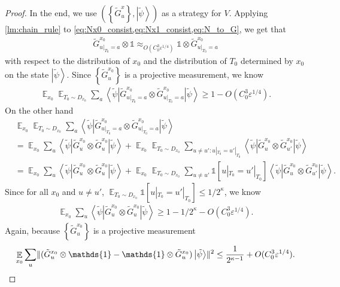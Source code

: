 \documentclass[11pt]{article}
\theoremstyle{plain}
\theoremstyle{definition}
\newcommand {\set} [1] {\ensuremath{ \left\lbrace #1 \right\rbrace }}
\DeclarePairedDelimiter{\norm}{\lVert}{\rVert}
\newcommand {\bra} [1] {\ensuremath{ \left\langle #1 \right| }}
\newcommand {\ket} [1] {\ensuremath{ \left| #1 \right\rangle }}
\DeclareMathOperator*{\bigE}{\mathbb{E}}
\newcommand {\id} {\ensuremath{\mathds{1}}}
\newcommand{\ep} {\ensuremath{\varepsilon}}
\newcommand{\x}{\otimes}
\newcommand{\appd}[1]{\approx_{#1}}
\newcommand{\1}{\mathbb{1}} %
\newcommand{\tG}{\tilde{G}}
\newcommand{\tpsi}{\tilde{\psi}}
\begin{document}
\begin{proof}
In the end, we use $(\set{ \tG^x_u }, \ket{\tpsi})$ as a strategy for $V$.
Applying \cref{lm:chain_rule} to \cref{eq:Nx0_consist,eq:Nx1_consist,eq:N_to_G}, we get that 
\begin{align*}
	\tG^{x_0}_{u|_{T_0}=a} \x \id \appd{O(C_0^3\ep^{1/4})} \id \x \tG^{x_0}_{u|_{T_0}= a}
\end{align*}
with respect to the distribution of $x_0$ and the distribution of $T_0$ determined by $x_0$ on the state $\ket{\tpsi}$.
Since $\set{ \tG^{x_0}_u }$ is a projective measurement, we know
\begin{align*}
	\bigE_{x_0} \bigE_{T_0 \sim D_{x_0}} \sum_a \bra{\tpsi} \tG^{x_0}_{u|_{T_0} = a} \x \tG^{x_0}_{u|_{T_0} = a} \ket{\tpsi} \geq 1 - O(C_0^3\ep^{1/4}).
\end{align*}
On the other hand
\begin{align*}
	&\bigE_{x_0} \bigE_{T_0 \sim D_{x_0}} \sum_a \bra{\tpsi} \tG^{x_0}_{u|_{T_0} = a} \x \tG^{x_0}_{u|_{T_0} = a} \ket{\tpsi} \\
	&= \bigE_{x_0} \sum_u \bra{\tpsi} \tG^{x_0}_{u} \x \tG^{x_0}_{u} \ket{\tpsi} 
	+ \bigE_{x_0} \bigE_{T_0\sim D_{x_0}} \sum_{u\neq u': u|_{T_0} = u'|_{T_0}} \bra{\tpsi} \tG^{x_0}_{u} \x \tG^{x_0}_{u'} \ket{\tpsi} \\
	&= \bigE_{x_0} \sum_u \bra{\tpsi} \tG^{x_0}_{u} \x \tG^{x_0}_{u} \ket{\tpsi} + 
	\bigE_{x_0} \bigE_{T_0\sim D_{x_0}} \sum_{u \neq u'} \id[u|_{T_0} = u'|_{T_0}] \bra{\tpsi} \tG^{x_0}_{u} \x \tG^{x_0}_{u'} \ket{\tpsi}.
\end{align*}
Since for all $x_0$ and $u \neq u'$, $\bigE_{T_0\sim D_{x_0}}\id[u|_{T_0} = u'|_{T_0}] \leq 1/2^\kappa$, we know
\begin{align*}
	 \bigE_{x_0} \sum_u \bra{\tpsi} \tG^{x_0}_{u} \x \tG^{x_0}_{u} \ket{\tpsi} \geq 1 - 1/2^\kappa - O(C_0^3\ep^{1/4}).
\end{align*}
Again, because $\set{\tG^{x_0}_u}$ is a projective measurement 
\begin{align*}
	\bigE_{x_0} \sum_u \norm{ (\tG^{x_0}_u \x \id - \id \x \tG^{x_0}_u) \ket{\tpsi}}^2 \leq \frac{1}{2^{\kappa-1}} + O(C_0^3\ep^{1/4}).
\end{align*}


\end{proof}
\end{document}
